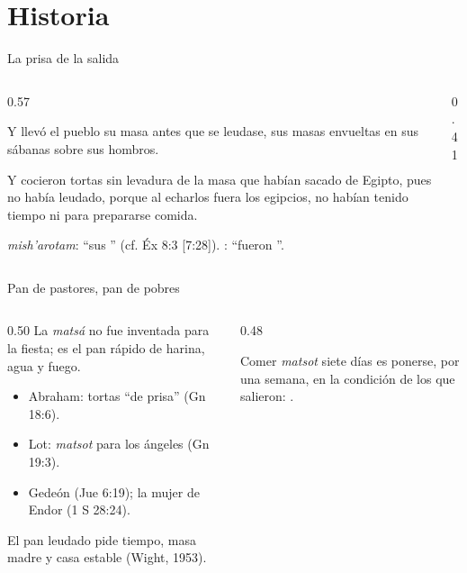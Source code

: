 \section{Historia}

\begin{frame}{La prisa de la salida}
\begin{columns}[c,onlytextwidth]
\begin{column}{0.57\textwidth}
\begin{cita}Y llevó el pueblo su masa antes que se leudase, sus masas envueltas en sus sábanas sobre sus hombros.\end{cita}
\begin{cita}Y cocieron tortas sin levadura de la masa que habían sacado de Egipto, pues no había leudado, porque al echarlos fuera los egipcios, no habían tenido tiempo ni para prepararse comida.\end{cita}
\scriptsize {} \emph{mish'arotam}: ``sus '' (cf. Éx 8:3 [7:28]). : ``fueron ''.
\end{column}
\begin{column}{0.41\textwidth}\end{column}
\end{columns}
\end{frame}

\begin{frame}{Pan de pastores, pan de pobres}
\begin{columns}[t,onlytextwidth]
\begin{column}{0.50\textwidth}\small
La \emph{matsá} no fue inventada para la fiesta; es el pan rápido de harina, agua y fuego.
\begin{itemize}
\item Abraham: tortas ``de prisa'' (Gn 18:6).
\item Lot: \emph{matsot} para los ángeles (Gn 19:3).
\item Gedeón (Jue 6:19); la mujer de Endor (1 S 28:24).
\end{itemize}
El pan leudado pide tiempo, masa madre y casa estable (Wight, 1953).
\end{column}
\begin{column}{0.48\textwidth}
\begin{tcolorbox}[colback=papiro,colframe=tierraroja,boxrule=1pt,arc=3pt]
\small\centering Comer \emph{matsot} siete días es ponerse, por una semana, en la condición de los que salieron: .
\end{tcolorbox}
\end{column}
\end{columns}
\end{frame}

